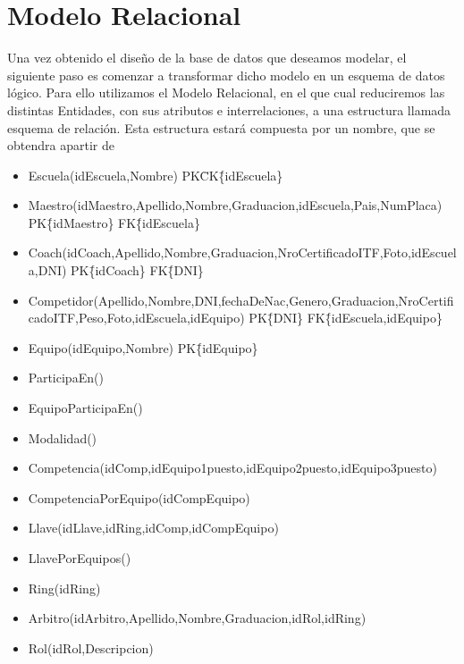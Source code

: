 \section{Modelo Relacional}

Una vez obtenido el diseño de la base de datos que deseamos modelar, el siguiente paso es comenzar a transformar dicho modelo en un esquema de datos lógico. Para ello utilizamos el Modelo Relacional, en el que cual reduciremos las distintas Entidades, con sus atributos e interrelaciones, a una estructura llamada esquema de relación. Esta estructura estará compuesta por un nombre, que se obtendra apartir de 

\begin{itemize}

\item{Escuela(idEscuela,Nombre)
PK\=CK\=\{idEscuela\}}

\item{Maestro(idMaestro,Apellido,Nombre,Graduacion,idEscuela,Pais,NumPlaca)
PK\=\{idMaestro\}
FK\=\{idEscuela\}
}

\item{Coach(idCoach,Apellido,Nombre,Graduacion,NroCertificadoITF,Foto,idEscuela,DNI)
PK\=\{idCoach\}
FK\=\{DNI\}
}

\item{Competidor(Apellido,Nombre,DNI,fechaDeNac,Genero,Graduacion,NroCertificadoITF,Peso,Foto,idEscuela,idEquipo)
PK\=\{DNI\}
FK\=\{idEscuela,idEquipo\}
}
\item{Equipo(idEquipo,Nombre)
PK\=\{idEquipo\}
}

\item ParticipaEn()

\item{EquipoParticipaEn()}

\item Modalidad()

\item Competencia(idComp,idEquipo1puesto,idEquipo2puesto,idEquipo3puesto)

\item CompetenciaPorEquipo(idCompEquipo)

\item Llave(idLlave,idRing,idComp,idCompEquipo)

\item LlavePorEquipos()

\item Ring(idRing)

\item Arbitro(idArbitro,Apellido,Nombre,Graduacion,idRol,idRing)

\item Rol(idRol,Descripcion)




\end{itemize}

